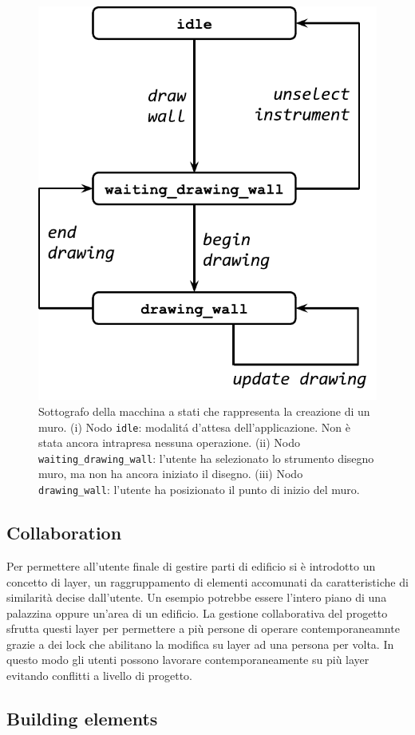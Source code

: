 \begin{figure}[!t]
\centering
\includegraphics[width=0.6\linewidth]{contents/images/uc_draw_wall}

\caption{Sottografo della macchina a stati che rappresenta la creazione di un muro. (i) Nodo \texttt{idle}: modalit\'a d'attesa dell'applicazione. Non è stata ancora intrapresa nessuna operazione. (ii) Nodo \texttt{waiting\_drawing\_wall}: l'utente ha selezionato lo strumento disegno muro, ma non ha ancora iniziato il disegno. (iii) Nodo \texttt{drawing\_wall}: l'utente ha posizionato il punto di inizio del muro.}
\label{fig_sim}
\end{figure}




\subsection{Collaboration}
    Per permettere all'utente finale di gestire parti di edificio si \`e introdotto un concetto di layer, un raggruppamento di elementi accomunati da caratteristiche di similarit\`a decise dall'utente. Un esempio potrebbe essere l'intero piano di una palazzina oppure un'area di un edificio. La gestione collaborativa del progetto sfrutta questi layer per permettere a pi\`u persone di operare contemporaneamnte grazie a dei lock che abilitano la modifica su layer ad una persona per volta. In questo modo gli utenti possono lavorare contemporaneamente su pi\`u layer evitando conflitti a livello di progetto.


\subsection{Building elements}


